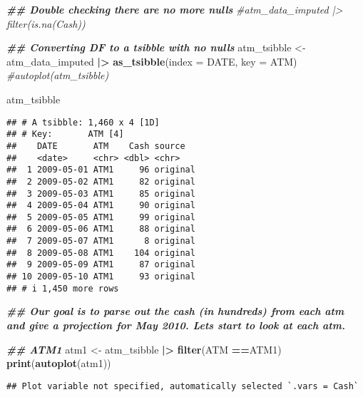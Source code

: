 \documentclass[
]{article}
\newenvironment{Shaded}{\begin{snugshade}}{\end{snugshade}}
\newcommand{\AttributeTok}[1]{\textcolor[rgb]{0.13,0.29,0.53}{#1}}
\newcommand{\CommentTok}[1]{\textcolor[rgb]{0.56,0.35,0.01}{\textit{#1}}}
\newcommand{\DocumentationTok}[1]{\textcolor[rgb]{0.56,0.35,0.01}{\textbf{\textit{#1}}}}
\newcommand{\FunctionTok}[1]{\textcolor[rgb]{0.13,0.29,0.53}{\textbf{#1}}}
\newcommand{\NormalTok}[1]{#1}
\newcommand{\OtherTok}[1]{\textcolor[rgb]{0.56,0.35,0.01}{#1}}
\newcommand{\SpecialCharTok}[1]{\textcolor[rgb]{0.81,0.36,0.00}{\textbf{#1}}}
\newcommand{\StringTok}[1]{\textcolor[rgb]{0.31,0.60,0.02}{#1}}
\begin{document}
\begin{Shaded}
\begin{Highlighting}[]
\DocumentationTok{\#\# Double checking there are no more nulls}
\CommentTok{\#atm\_data\_imputed |\textgreater{} filter(is.na(Cash))}

\DocumentationTok{\#\# Converting DF to a tsibble with no nulls}
\NormalTok{atm\_tsibble }\OtherTok{\textless{}{-}}\NormalTok{ atm\_data\_imputed }\SpecialCharTok{|\textgreater{}} \FunctionTok{as\_tsibble}\NormalTok{(}\AttributeTok{index =}\NormalTok{ DATE, }\AttributeTok{key =}\NormalTok{ ATM)}
\CommentTok{\#autoplot(atm\_tsibble)}
\end{Highlighting}
\end{Shaded}

\begin{Shaded}
\begin{Highlighting}[]
\NormalTok{atm\_tsibble}
\end{Highlighting}
\end{Shaded}

\begin{verbatim}
## # A tsibble: 1,460 x 4 [1D]
## # Key:       ATM [4]
##    DATE       ATM    Cash source  
##    <date>     <chr> <dbl> <chr>   
##  1 2009-05-01 ATM1     96 original
##  2 2009-05-02 ATM1     82 original
##  3 2009-05-03 ATM1     85 original
##  4 2009-05-04 ATM1     90 original
##  5 2009-05-05 ATM1     99 original
##  6 2009-05-06 ATM1     88 original
##  7 2009-05-07 ATM1      8 original
##  8 2009-05-08 ATM1    104 original
##  9 2009-05-09 ATM1     87 original
## 10 2009-05-10 ATM1     93 original
## # i 1,450 more rows
\end{verbatim}

\begin{Shaded}
\begin{Highlighting}[]
\DocumentationTok{\#\# Our goal is to parse out the cash (in hundreds) from each atm and give a projection for May 2010. Lets start to look at each atm. }

\DocumentationTok{\#\# ATM1 }
\NormalTok{atm1 }\OtherTok{\textless{}{-}}\NormalTok{ atm\_tsibble }\SpecialCharTok{|\textgreater{}} \FunctionTok{filter}\NormalTok{(ATM }\SpecialCharTok{==}\StringTok{\textquotesingle{}ATM1\textquotesingle{}}\NormalTok{)}
\FunctionTok{print}\NormalTok{(}\FunctionTok{autoplot}\NormalTok{(atm1))}
\end{Highlighting}
\end{Shaded}

\begin{verbatim}
## Plot variable not specified, automatically selected `.vars = Cash`
\end{verbatim}
\end{document}
